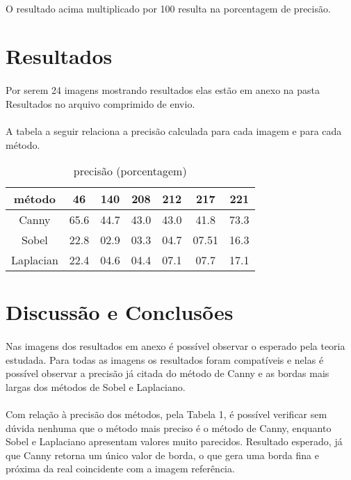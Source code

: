 \documentclass[conference, harvard, brazil, english]{sbatex}
\begin{document}
			\paragraph{}
			O resultado acima multiplicado por 100 resulta na porcentagem de precisão.
		\section{Resultados}
			\paragraph{}
			Por serem 24 imagens mostrando resultados elas estão em anexo na pasta Resultados no arquivo comprimido de envio.
			\paragraph{}
			A tabela a seguir relaciona a precisão calculada para cada imagem e para cada método.	
			\begin{table}[ht]
			\caption{precisão (porcentagem)}
			\centering
			\begin{tabular}{c c c c c c c}
				método & 46 & 140 & 208 & 212 &	217 & 221\\
				\hline\hline
				Canny & 65.6 & 44.7 & 43.0 & 43.0 & 41.8 & 73.3\\
				Sobel & 22.8 & 02.9 & 03.3 & 04.7 & 07.51 & 16.3\\
				Laplacian &	22.4 & 04.6 & 04.4 & 07.1 & 07.7 & 17.1\\
			\end{tabular}
			\end{table}
		\section{Discussão e Conclusões}
			\paragraph{}
			Nas imagens dos resultados em anexo é possível observar o esperado pela teoria estudada. Para todas as imagens os resultados foram compatíveis e nelas é possível observar a precisão já citada do método de Canny e as bordas mais largas dos métodos de Sobel e Laplaciano.
			\paragraph{}
			Com relação à precisão dos métodos, pela Tabela 1, é possível verificar sem dúvida nenhuma que o método mais preciso é o método de Canny, enquanto Sobel e Laplaciano apresentam valores muito parecidos. Resultado esperado, já que Canny retorna um único valor de borda, o que gera uma borda fina e próxima da real coincidente com a imagem referência.
			
		
\end{document}
